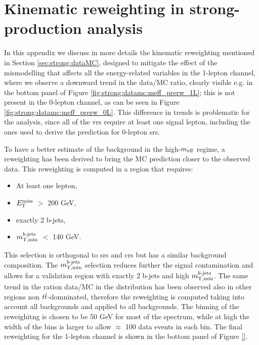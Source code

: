 \chapter{Kinematic reweighting in strong-production analysis}
\label{app:meffrw}

In this appendix we discuss in more details the kinematic reweighting mentioned in Section \ref{sec:strong:dataMC},
designed to mitigate the effect of the mismodelling that affects all the energy-related variables in the 1-lepton channel,
where we observe a downward trend in the data/MC ratio, clearly visible e.g. in the bottom panel of 
Figure \ref{fig:strong:datamc:meff_prerw_1L}; this is not present in the 0-lepton channel, as can be seen in 
Figure \ref{fig:strong:datamc:meff_prerw_0L}.
This difference in trends is problematic for the analysis, since all of the \glspl{vr} require at least one signal lepton, 
including the ones used to derive the prediction for 0-lepton \glspl{sr}.

To have a better estimate of the background in the high-$m_{\mathrm{eff}}$ regime, a reweighting has been derived to bring the MC prediction closer to the observed data. This reweighting is computed in a region that requires:
\begin{itemize}
\item At least one lepton,
\item $E_{\rm T}^{\mathrm{miss}}$ $>$ 200 GeV,
\item exactly 2 b-jets,
\item $m_{\mathrm{T, min}}^{b\textrm{-jets}}$ $<$ 140 GeV.
\end{itemize}

This selection is orthogonal to \glspl{sr} and \glspl{cr} but has a similar background composition. 
The $m_{\mathrm{T, min}}^{b\textrm{-jets}}$ selection reduces further the signal contamination and allows for a validation region with exactly 2 b-jets and high $m_{\mathrm{T, min}}^{b\textrm{-jets}}$. 
The same trend in the ration data/MC in the \meff distribution has been observed also in other regions non $t\overline{t}$-domninated,
therefore the reweighting is computed taking into account all backgrounds and applied to all backgrounds. 
The binning of the reweighitng is chosen to be 50 GeV for most of the \meff spectrum, 
while at high \meff the width of the bins is larger to allow $\approx$ 100 data events in each bin. 
The final reweighting for the 1-lepton channel is shown in the bottom panel of Figure \ref{}.

